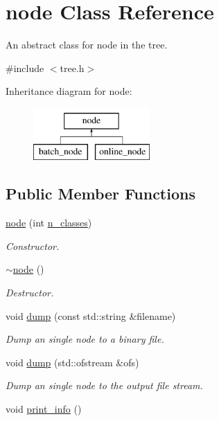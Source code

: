 \hypertarget{classnode}{\section{node Class Reference}
\label{classnode}
}


An abstract class for node in the tree.  




{\ttfamily \#include $<$tree.\+h$>$}

Inheritance diagram for node\+:\begin{figure}[H]
\begin{center}
\leavevmode
\includegraphics[height=2.000000cm]{classnode}
\end{center}
\end{figure}
\subsection*{Public Member Functions}
\begin{DoxyCompactItemize}
\item 
\hyperlink{classnode_a7e5f4a2e917fe20d91d75faf2e9ba5de}{node} (int \hyperlink{classnode_a8c4864582cb3fe15e84e7908d0965150}{n\+\_\+classes})
\begin{DoxyCompactList}\small\item\em Constructor. \end{DoxyCompactList}\item 
\hyperlink{classnode_a482f83436a89f09d289b26144d817adf}{$\sim$node} ()
\begin{DoxyCompactList}\small\item\em Destructor. \end{DoxyCompactList}\item 
void \hyperlink{classnode_a873438b420d0f6d2659a1b25875ed300}{dump} (const std\+::string \&filename)
\begin{DoxyCompactList}\small\item\em Dump an single node to a binary file. \end{DoxyCompactList}\item 
void \hyperlink{classnode_acab00fde3bcc5d44044c39a37313b4eb}{dump} (std\+::ofstream \&ofs)
\begin{DoxyCompactList}\small\item\em Dump an single node to the output file stream. \end{DoxyCompactList}\item 
void \hyperlink{classnode_a95d492b993f2bd1b59c2489e7eb20a13}{print\+\_\+info} ()
\end{DoxyCompactItemize}
